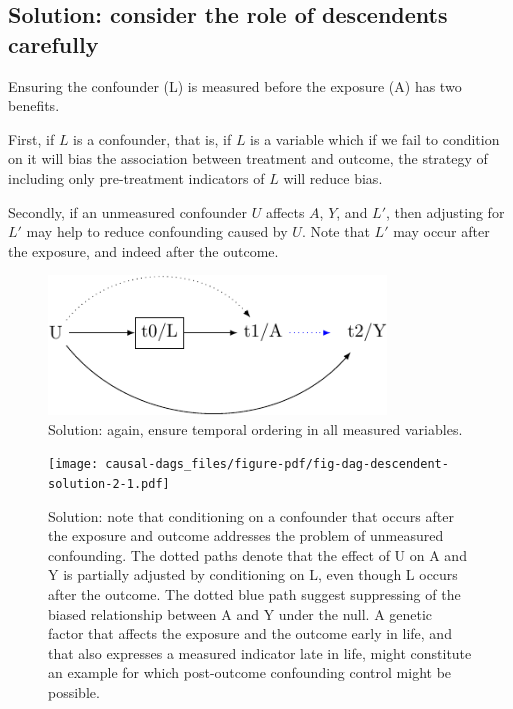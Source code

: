 \documentclass[
  singlecolumn]{report}
\begin{document}
\hypertarget{solution-consider-the-role-of-descendents-carefully}{%
\subsection{Solution: consider the role of descendents
carefully}\label{solution-consider-the-role-of-descendents-carefully}}

Ensuring the confounder (L) is measured before the exposure (A) has two
benefits.

First, if \(L\) is a confounder, that is, if \(L\) is a variable which
if we fail to condition on it will bias the association between
treatment and outcome, the strategy of including only pre-treatment
indicators of \(L\) will reduce bias.

Secondly, if an unmeasured confounder \(U\) affects \(A\), \(Y\), and
\(L\prime\), then adjusting for \(L\prime\) may help to reduce
confounding caused by \(U\). Note that \(L\prime\) may occur after the
exposure, and indeed after the outcome.

\begin{figure}

{\centering \includegraphics[width=0.8\textwidth,height=\textheight]{causal-dags_files/figure-pdf/fig-dag-descendent-solution-1.pdf}

}

\caption{\label{fig-dag-descendent-solution}Solution: again, ensure
temporal ordering in all measured variables.}

\end{figure}

\begin{figure}

{\centering \texttt{[image: causal-dags\_files/figure-pdf/fig-dag-descendent-solution-2-1.pdf]}

}

\caption{\label{fig-dag-descendent-solution-2}Solution: note that
conditioning on a confounder that occurs after the exposure and outcome
addresses the problem of unmeasured confounding. The dotted paths denote
that the effect of U on A and Y is partially adjusted by conditioning on
L, even though L occurs after the outcome. The dotted blue path suggest
suppressing of the biased relationship between A and Y under the null. A
genetic factor that affects the exposure and the outcome early in life,
and that also expresses a measured indicator late in life, might
constitute an example for which post-outcome confounding control might
be possible.}

\end{figure}
\end{document}
